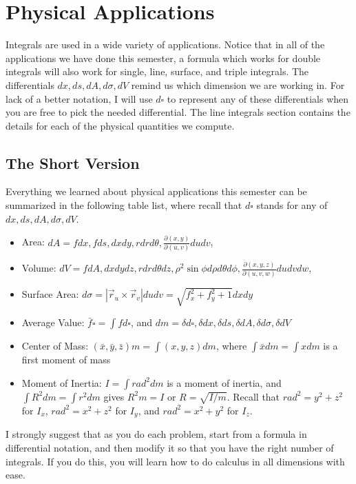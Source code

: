 \section{Physical Applications}
%
Integrals are used in a wide variety of applications.  Notice that in
all of the applications we have done this semester, a formula which
works for double integrals will also work for single, line, surface,
and triple integrals.  The differentials $dx,ds,dA,d\sigma, dV$ remind us
which dimension we are working in.  For lack of a better notation,  I
will use $d\square$ to represent any of these differentials when you
are free to pick the needed differential. The line integrals section
contains the details for each of the physical quantities we compute.


\subsection{The Short Version}
Everything we learned about physical applications this semester can be
summarized in the following table list, where recall that $d\square$
stands for any of $dx,ds,dA,d\sigma,dV$.
\begin{itemize}
\item Area: $dA = fdx,fds, dxdy, rdrd\theta, \frac{\partial(x,y)}{\partial(u,v)}dudv$, 
\item Volume: $dV = fdA,dxdydz, rdrd\theta dz, \rho^2\sin\phi d\rho d\theta d\phi,
\frac{\partial(x,y,z)}{\partial(u,v,w)}dudvdw$, 
\item Surface Area: $d\sigma = |\vec r_u\times \vec r_v|dudv =
\sqrt{f_x^2+f_y^2+1}dxdy$
\item Average Value: $\bar f\square = \int fd\square$, and $dm = \delta
d\square , \delta dx, \delta ds, \delta dA, \delta d\sigma, \delta dV $
\item Center of Mass: $(\bar x,\bar y,\bar z)m = \int(x,y,z) dm$, where
$\int \bar x dm = \int x dm$ is a first moment of mass
\item Moment of Inertia: $I = \int rad^2 dm$ is a moment of inertia, and
$\int R^2 dm = \int r^2 dm$ gives $R^2 m =I$ or $R=\sqrt{I/m}$. Recall that
$rad^2 = y^2+z^2$ for $I_x$, $rad^2=x^2+z^2$ for $I_y$, and
$rad^2=x^2+y^2$ for $I_z$.
\end{itemize}
I strongly suggest that as you do each problem, start from a formula
in differential notation, and then modify it so that you have the
right number of integrals.  If you do this, you will learn how to do
calculus in all dimensions with ease. 

